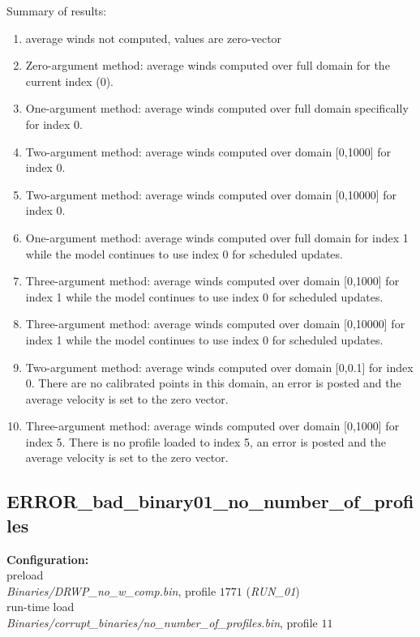 \documentclass[11pt,fleqn]{report}
\begin{document}
Summary of results:
\begin{enumerate}
\setcounter{enumi}{0}
\item average winds not computed, values are zero-vector
\item Zero-argument method: average winds computed over full domain for
  the current index (0).
\item One-argument method: average winds computed over full domain
  specifically for index 0.
\item Two-argument method: average winds computed over domain [0,1000]
  for index 0.
\item Two-argument method: average winds computed over domain [0,10000]
  for index 0.
\item One-argument method: average winds computed over full domain
  for index 1 while the model continues to use index 0 for scheduled updates.
\item Three-argument method: average winds computed over domain [0,1000]
  for index 1 while the model continues to use index 0 for scheduled updates.
\item Three-argument method: average winds computed over domain [0,10000]
  for index 1 while the model continues to use index 0 for scheduled updates.
\item Two-argument method: average winds computed over domain [0,0.1]
  for index 0. There are no calibrated points in this domain, an error
  is posted and the average velocity is set to the zero vector.
\item Three-argument method: average winds computed over domain [0,1000]
  for index 5. There is no profile loaded to index 5, an error is posted
  and the average velocity is set to the zero vector.
\end{enumerate}


\subsection{ERROR\_bad\_binary01\_no\_number\_of\_profiles}
\textbf{Configuration:}\\ preload\\
\textit{Binaries/DRWP\_no\_w\_comp.bin}, profile $1771$ (\textit{RUN\_01})\\
run-time load\\
\textit{Binaries/corrupt\_binaries/no\_number\_of\_profiles.bin}, profile $11$
\end{document}
